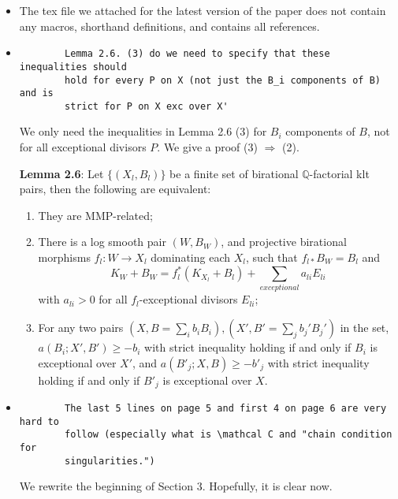 \documentclass[11pt]{article}
\begin{document}
\begin{itemize}
    \item The tex file we attached for the latest version of the paper does not contain any macros, shorthand definitions, and contains all references.
    
    \bigskip
    
    \item \begin{verbatim}
        Lemma 2.6. (3) do we need to specify that these inequalities should
        hold for every P on X (not just the B_i components of B) and is
        strict for P on X exc over X'
    \end{verbatim} 
    
   We only need the inequalities in Lemma 2.6 (3) for $B_i$ components of $B$, not for all exceptional divisors $P$. We give a proof (3) $\Rightarrow$ (2).
   
   \bigskip

\textbf{Lemma 2.6}:
  Let $ \{(X_l,B_l)\} $ be a finite set of birational $ \mathbb{Q} $-factorial klt pairs, then the following are equivalent:
  \begin{enumerate}
    \item They are MMP-related;
    \item There is a log smooth pair $ (W,B_W) $, and projective birational morphisms $ f_l:W\to  X_l $ dominating each $ X_l $, such that $ f_{l*}B_W=B_l $ and
          \[ K_W+B_W=f_l^*(K_{X_l}+B_l)+\sum_{exceptional}{a_{li}E_{li}} \]
          with $ a_{li}>0 $ for all $ f_l $-exceptional divisors $E_{li}$;
    \item For any two pairs $ (X,B=\sum_ib_{i }B_i),(X',B'=\sum_{j}b_{j}'B_{j}') $ in the set,  $ a(B_i;X',B')\geqslant -b_i $ with strict inequality holding if and only if $ B_i $ is exceptional over $ X' $, and $ a(B'_j;X,B)\geqslant -b'_j $ with strict inequality holding if and only if $ B'_j $ is exceptional over $ X $.

  \end{enumerate}
  
  \bigskip
  
  \item 
  \begin{verbatim}
        The last 5 lines on page 5 and first 4 on page 6 are very hard to 
        follow (especially what is \mathcal C and "chain condition for
        singularities.")
    \end{verbatim} 
  We rewrite the beginning of Section 3. Hopefully, it is clear now.
  

\end{itemize}
\end{document}
